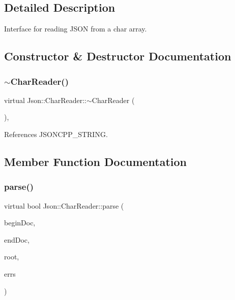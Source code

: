 \subsection{Detailed Description}
Interface for reading J\+S\+ON from a char array. 

\subsection{Constructor \& Destructor Documentation}
\mbox{\label{classJson_1_1CharReader_acaa7b6ad04fe1cf2ddfca06e66550d7e_acaa7b6ad04fe1cf2ddfca06e66550d7e}} 
\subsubsection{\texorpdfstring{$\sim$\+Char\+Reader()}{~CharReader()}}
{\footnotesize\ttfamily virtual Json\+::\+Char\+Reader\+::$\sim$\+Char\+Reader (\begin{DoxyParamCaption}{ }\end{DoxyParamCaption})\hspace{0.3cm}{\ttfamily [inline]}, {\ttfamily [virtual]}}



References J\+S\+O\+N\+C\+P\+P\+\_\+\+S\+T\+R\+I\+NG.



\subsection{Member Function Documentation}
\mbox{\label{classJson_1_1CharReader_a7983680d50fd0745f371c43b162e78e1_a7983680d50fd0745f371c43b162e78e1}} 
\subsubsection{\texorpdfstring{parse()}{parse()}}
{\footnotesize\ttfamily virtual bool Json\+::\+Char\+Reader\+::parse (\begin{DoxyParamCaption}\item[{char const $\ast$}]{begin\+Doc,  }\item[{char const $\ast$}]{end\+Doc,  }\item[{\hyperlink{classJson_1_1Value}{Value} $\ast$}]{root,  }\item[{\hyperlink{json_8h_a1e723f95759de062585bc4a8fd3fa4be_a1e723f95759de062585bc4a8fd3fa4be}{J\+S\+O\+N\+C\+P\+P\+\_\+\+S\+T\+R\+I\+NG} $\ast$}]{errs }\end{DoxyParamCaption})\hspace{0.3cm}{\ttfamily [pure virtual]}}



